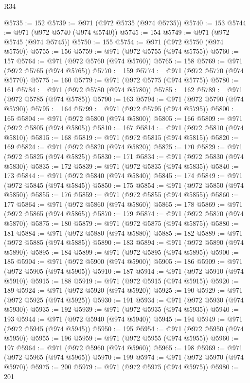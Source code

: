\begin{lexlean}{R34}
\begin{coremodule}
@5735 := 152
@5739 := @971 (@972 @5735 (@974 @5735))
@5740 := 153
@5744 := @971 (@972 @5740 (@974 @5740))
@5745 := 154
@5749 := @971 (@972 @5745 (@974 @5745))
@5750 := 155
@5754 := @971 (@972 @5750 (@974 @5750))
@5755 := 156
@5759 := @971 (@972 @5755 (@974 @5755))
@5760 := 157
@5764 := @971 (@972 @5760 (@974 @5760))
@5765 := 158
@5769 := @971 (@972 @5765 (@974 @5765))
@5770 := 159
@5774 := @971 (@972 @5770 (@974 @5770))
@5775 := 160
@5779 := @971 (@972 @5775 (@974 @5775))
@5780 := 161
@5784 := @971 (@972 @5780 (@974 @5780))
@5785 := 162
@5789 := @971 (@972 @5785 (@974 @5785))
@5790 := 163
@5794 := @971 (@972 @5790 (@974 @5790))
@5795 := 164
@5799 := @971 (@972 @5795 (@974 @5795))
@5800 := 165
@5804 := @971 (@972 @5800 (@974 @5800))
@5805 := 166
@5809 := @971 (@972 @5805 (@974 @5805))
@5810 := 167
@5814 := @971 (@972 @5810 (@974 @5810))
@5815 := 168
@5819 := @971 (@972 @5815 (@974 @5815))
@5820 := 169
@5824 := @971 (@972 @5820 (@974 @5820))
@5825 := 170
@5829 := @971 (@972 @5825 (@974 @5825))
@5830 := 171
@5834 := @971 (@972 @5830 (@974 @5830))
@5835 := 172
@5839 := @971 (@972 @5835 (@974 @5835))
@5840 := 173
@5844 := @971 (@972 @5840 (@974 @5840))
@5845 := 174
@5849 := @971 (@972 @5845 (@974 @5845))
@5850 := 175
@5854 := @971 (@972 @5850 (@974 @5850))
@5855 := 176
@5859 := @971 (@972 @5855 (@974 @5855))
@5860 := 177
@5864 := @971 (@972 @5860 (@974 @5860))
@5865 := 178
@5869 := @971 (@972 @5865 (@974 @5865))
@5870 := 179
@5874 := @971 (@972 @5870 (@974 @5870))
@5875 := 180
@5879 := @971 (@972 @5875 (@974 @5875))
@5880 := 181
@5884 := @971 (@972 @5880 (@974 @5880))
@5885 := 182
@5889 := @971 (@972 @5885 (@974 @5885))
@5890 := 183
@5894 := @971 (@972 @5890 (@974 @5890))
@5895 := 184
@5899 := @971 (@972 @5895 (@974 @5895))
@5900 := 185
@5904 := @971 (@972 @5900 (@974 @5900))
@5905 := 186
@5909 := @971 (@972 @5905 (@974 @5905))
@5910 := 187
@5914 := @971 (@972 @5910 (@974 @5910))
@5915 := 188
@5919 := @971 (@972 @5915 (@974 @5915))
@5920 := 189
@5924 := @971 (@972 @5920 (@974 @5920))
@5925 := 190
@5929 := @971 (@972 @5925 (@974 @5925))
@5930 := 191
@5934 := @971 (@972 @5930 (@974 @5930))
@5935 := 192
@5939 := @971 (@972 @5935 (@974 @5935))
@5940 := 193
@5944 := @971 (@972 @5940 (@974 @5940))
@5945 := 194
@5949 := @971 (@972 @5945 (@974 @5945))
@5950 := 195
@5954 := @971 (@972 @5950 (@974 @5950))
@5955 := 196
@5959 := @971 (@972 @5955 (@974 @5955))
@5960 := 197
@5964 := @971 (@972 @5960 (@974 @5960))
@5965 := 198
@5969 := @971 (@972 @5965 (@974 @5965))
@5970 := 199
@5974 := @971 (@972 @5970 (@974 @5970))
@5975 := 200
@5979 := @971 (@972 @5975 (@974 @5975))
@5980 := 201

\end{coremodule}
\end{lexlean}
